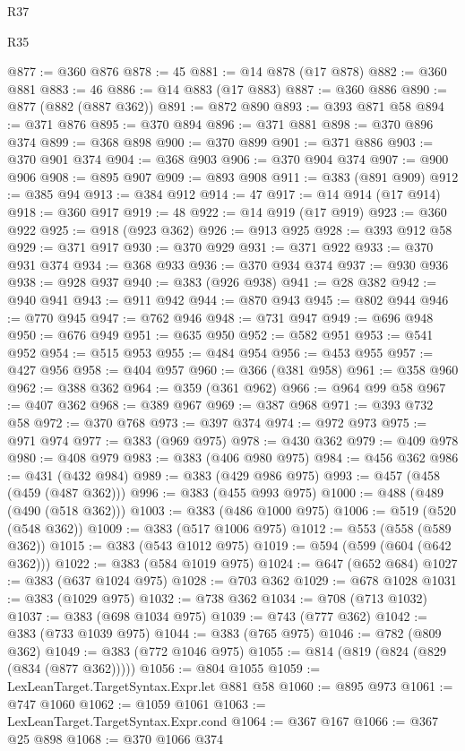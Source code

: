 \begin{lexlean}{R37}
\begin{lexlean}{R35}
\begin{coremodule}
{{{{{{{{{{{{{{{{{{{{{{{{{{{{{{{{{{{{{{{{{{{{{{{{{{{{@877 := @360 @876
@878 := 45
@881 := @14 @878 (@17 @878)
@882 := @360 @881
@883 := 46
@886 := @14 @883 (@17 @883)
@887 := @360 @886
@890 := @877 (@882 (@887 @362))
@891 := @872 @890
@893 := @393 @871 @58
@894 := @371 @876
@895 := @370 @894
@896 := @371 @881
@898 := @370 @896 @374
@899 := @368 @898
@900 := @370 @899
@901 := @371 @886
@903 := @370 @901 @374
@904 := @368 @903
@906 := @370 @904 @374
@907 := @900 @906
@908 := @895 @907
@909 := @893 @908
@911 := @383 (@891 @909)
@912 := @385 @94
@913 := @384 @912
@914 := 47
@917 := @14 @914 (@17 @914)
@918 := @360 @917
@919 := 48
@922 := @14 @919 (@17 @919)
@923 := @360 @922
@925 := @918 (@923 @362)
@926 := @913 @925
@928 := @393 @912 @58
@929 := @371 @917
@930 := @370 @929
@931 := @371 @922
@933 := @370 @931 @374
@934 := @368 @933
@936 := @370 @934 @374
@937 := @930 @936
@938 := @928 @937
@940 := @383 (@926 @938)
@941 := @28 @382
@942 := @940 @941
@943 := @911 @942
@944 := @870 @943
@945 := @802 @944
@946 := @770 @945
@947 := @762 @946
@948 := @731 @947
@949 := @696 @948
@950 := @676 @949
@951 := @635 @950
@952 := @582 @951
@953 := @541 @952
@954 := @515 @953
@955 := @484 @954
@956 := @453 @955
@957 := @427 @956
@958 := @404 @957
@960 := @366 (@381 @958)
@961 := @358 @960
@962 := @388 @362
@964 := @359 (@361 @962)
@966 := @964 @99 @58
@967 := @407 @362
@968 := @389 @967
@969 := @387 @968
@971 := @393 @732 @58
@972 := @370 @768
@973 := @397 @374
@974 := @972 @973
@975 := @971 @974
@977 := @383 (@969 @975)
@978 := @430 @362
@979 := @409 @978
@980 := @408 @979
@983 := @383 (@406 @980 @975)
@984 := @456 @362
@986 := @431 (@432 @984)
@989 := @383 (@429 @986 @975)
@993 := @457 (@458 (@459 (@487 @362)))
@996 := @383 (@455 @993 @975)
@1000 := @488 (@489 (@490 (@518 @362)))
@1003 := @383 (@486 @1000 @975)
@1006 := @519 (@520 (@548 @362))
@1009 := @383 (@517 @1006 @975)
@1012 := @553 (@558 (@589 @362))
@1015 := @383 (@543 @1012 @975)
@1019 := @594 (@599 (@604 (@642 @362)))
@1022 := @383 (@584 @1019 @975)
@1024 := @647 (@652 @684)
@1027 := @383 (@637 @1024 @975)
@1028 := @703 @362
@1029 := @678 @1028
@1031 := @383 (@1029 @975)
@1032 := @738 @362
@1034 := @708 (@713 @1032)
@1037 := @383 (@698 @1034 @975)
@1039 := @743 (@777 @362)
@1042 := @383 (@733 @1039 @975)
@1044 := @383 (@765 @975)
@1046 := @782 (@809 @362)
@1049 := @383 (@772 @1046 @975)
@1055 := @814 (@819 (@824 (@829 (@834 (@877 @362)))))
@1056 := @804 @1055
@1059 := LexLeanTarget.TargetSyntax.Expr.let @881 @58
@1060 := @895 @973
@1061 := @747 @1060
@1062 := @1059 @1061
@1063 := LexLeanTarget.TargetSyntax.Expr.cond
@1064 := @367 @167
@1066 := @367 @25 @898
@1068 := @370 @1066 @374
}}}}}}}}}}}}}}}}}}}}}}}}}}}}}}}}}}}}}}}}}}}}}}}}}}}}
\end{coremodule}
\end{lexlean}
\end{lexlean}
